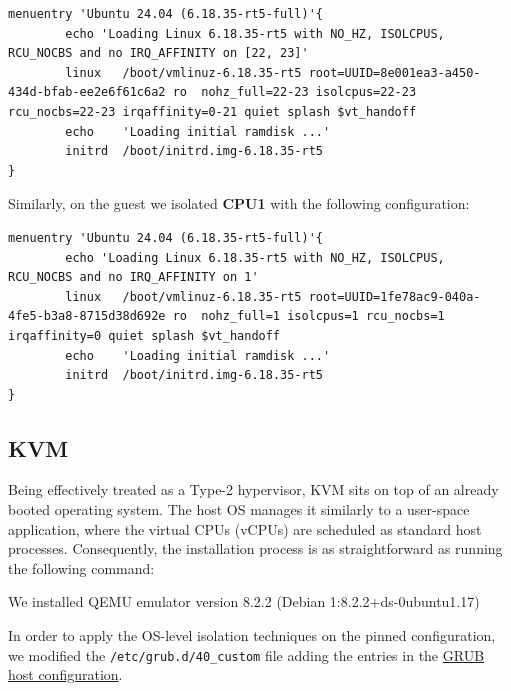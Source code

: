 \begin{Verbatim}[breaklines=true,breakanywhere=true]
menuentry 'Ubuntu 24.04 (6.18.35-rt5-full)'{
        echo 'Loading Linux 6.18.35-rt5 with NO_HZ, ISOLCPUS, RCU_NOCBS and no IRQ_AFFINITY on [22, 23]'
        linux   /boot/vmlinuz-6.18.35-rt5 root=UUID=8e001ea3-a450-434d-bfab-ee2e6f61c6a2 ro  nohz_full=22-23 isolcpus=22-23 rcu_nocbs=22-23 irqaffinity=0-21 quiet splash $vt_handoff
        echo    'Loading initial ramdisk ...'
        initrd  /boot/initrd.img-6.18.35-rt5
}
\end{Verbatim}

Similarly, on the guest we isolated \textbf{CPU1} with the following
configuration:

\begin{Verbatim}[breaklines=true,breakanywhere=true]
menuentry 'Ubuntu 24.04 (6.18.35-rt5-full)'{
        echo 'Loading Linux 6.18.35-rt5 with NO_HZ, ISOLCPUS, RCU_NOCBS and no IRQ_AFFINITY on 1'
        linux   /boot/vmlinuz-6.18.35-rt5 root=UUID=1fe78ac9-040a-4fe5-b3a8-8715d38d692e ro  nohz_full=1 isolcpus=1 rcu_nocbs=1 irqaffinity=0 quiet splash $vt_handoff
        echo    'Loading initial ramdisk ...'
        initrd  /boot/initrd.img-6.18.35-rt5
}
\end{Verbatim}

\subsection{KVM}\label{kvm}

Being effectively treated as a Type-2 hypervisor, KVM sits on top of an
already booted operating system. The host OS manages it similarly to a
user-space application, where the virtual CPUs (vCPUs) are scheduled as
standard host processes. Consequently, the installation process is as
straightforward as running the following command:

\begin{Shaded}
\begin{Highlighting}[]
\end{Highlighting}
\end{Shaded}

We installed QEMU emulator version 8.2.2 (Debian 1:8.2.2+ds-0ubuntu1.17)

In order to apply the OS-level isolation techniques on the pinned
configuration, we modified the \texttt{/etc/grub.d/40\_custom} file
adding the entries in the \href{KVM/grub_cfg/40_custom_host}{GRUB host
configuration}.

